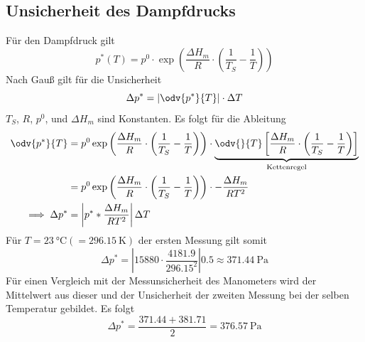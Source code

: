 \subsection{Unsicherheit des Dampfdrucks}\label{sec:err-dampfdruck}
Für den Dampfdruck gilt
\begin{equation*}
    p^*(T) = p^0 \cdot \exp{\left(\frac{\Delta H_m}{R} \cdot \left (\frac{1}{T_S} - \frac{1}{T} \right)\right)}
\end{equation*}
Nach Gauß gilt für die Unsicherheit
\begin{equation*}
    \Delta p^* =  \left| \odv{p^*}{T} \right| \cdot \Delta T
\end{equation*}
$T_S$, $R$, $p^0$, und $\Delta H_m$ sind Konstanten. Es folgt für die Ableitung
\begin{align*}
    \odv{p^*}{T} &= p^0 \exp{\left( \frac{\Delta H_m}{R} \cdot \left( \frac{1}{T_S} - \frac{1}{T} \right)\right)} \cdot
                    \underbrace{\odv{}{T} \left[ \frac{\Delta H_m}{R} \cdot \left( \frac{1}{T_S} - \frac{1}{T} \right) \right]}_{\text{Kettenregel}} \\
    &= p^0 \exp{\left( \frac{\Delta H_m}{R} \cdot \left( \frac{1}{T_S} - \frac{1}{T} \right)\right)} \cdot - \frac{\Delta H_m}{RT^2} \\
    \implies \Delta p^* &= \left| p^* * \frac{\Delta H_m}{RT^2} \right| \Delta T
\end{align*}
Für $T = \qty{23}{\degreeCelsius} (= \qty{296.15}{\kelvin})$ der ersten Messung gilt somit
\begin{equation*}
    \Delta p^* = \left| 15880 \cdot \frac{4181.9}{296.15^2} \right| 0.5 \approx \qty{371.44}{\pascal}
\end{equation*}
Für einen Vergleich mit der Messunsicherheit des Manometers wird der Mittelwert aus dieser und der Unsicherheit der zweiten Messung bei der selben Temperatur gebildet.
Es folgt
\begin{equation*}
    \Delta {p}^* = \frac{371.44 + 381.71}{2} = \qty{376.57}{\pascal}
\end{equation*}

